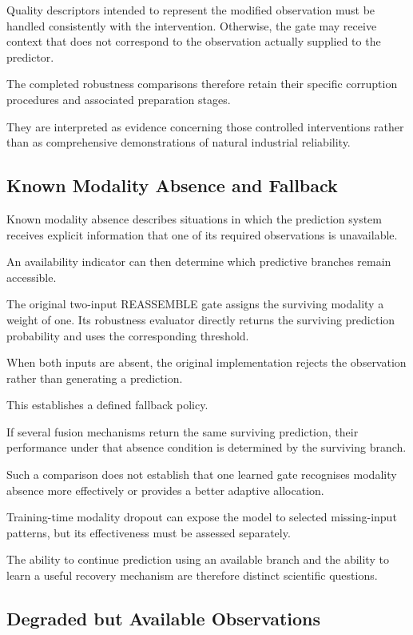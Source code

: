 Quality descriptors intended to represent the modified observation must be handled consistently with the intervention. Otherwise, the gate may receive context that does not correspond to the observation actually supplied to the predictor.

The completed robustness comparisons therefore retain their specific corruption procedures and associated preparation stages.

They are interpreted as evidence concerning those controlled interventions rather than as comprehensive demonstrations of natural industrial reliability.

\subsection{Known Modality Absence and Fallback}

Known modality absence describes situations in which the prediction system receives explicit information that one of its required observations is unavailable.

An availability indicator can then determine which predictive branches remain accessible.

The original two-input REASSEMBLE gate assigns the surviving modality a weight of one. Its robustness evaluator directly returns the surviving prediction probability and uses the corresponding threshold.

When both inputs are absent, the original implementation rejects the observation rather than generating a prediction.

This establishes a defined fallback policy.

If several fusion mechanisms return the same surviving prediction, their performance under that absence condition is determined by the surviving branch.

Such a comparison does not establish that one learned gate recognises modality absence more effectively or provides a better adaptive allocation.

Training-time modality dropout can expose the model to selected missing-input patterns, but its effectiveness must be assessed separately.

The ability to continue prediction using an available branch and the ability to learn a useful recovery mechanism are therefore distinct scientific questions.

\subsection{Degraded but Available Observations}

